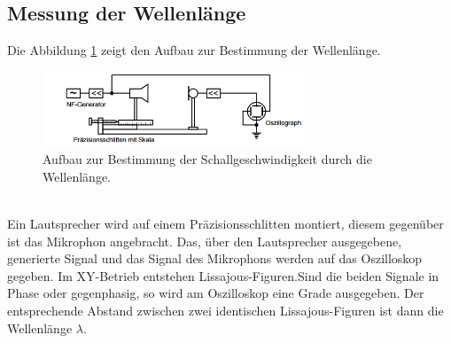 \subsection{Messung der Wellenlänge}
Die Abbildung \ref{fig:schall} zeigt den Aufbau zur Bestimmung der Wellenlänge.
\begin{figure}
 \centering
 \includegraphics[width=0.7\textwidth]{schall.png}
 \caption{Aufbau zur Bestimmung der Schallgeschwindigkeit durch die Wellenlänge. \cite{skript}}
 \label{fig:schall}
 \end{figure}\\
Ein Lautsprecher wird auf einem Präzisionsschlitten montiert, diesem gegenüber ist das Mikrophon angebracht.
Das, über den Lautsprecher ausgegebene, generierte Signal und das Signal des Mikrophons werden auf das Oszilloskop gegeben.
Im XY-Betrieb entstehen Lissajous-Figuren.Sind die beiden Signale in Phase oder gegenphasig,
so wird am Oszilloskop eine Grade ausgegeben.
Der entsprechende Abstand zwischen zwei identischen Lissajous-Figuren ist dann die Wellenlänge $\lambda$.
